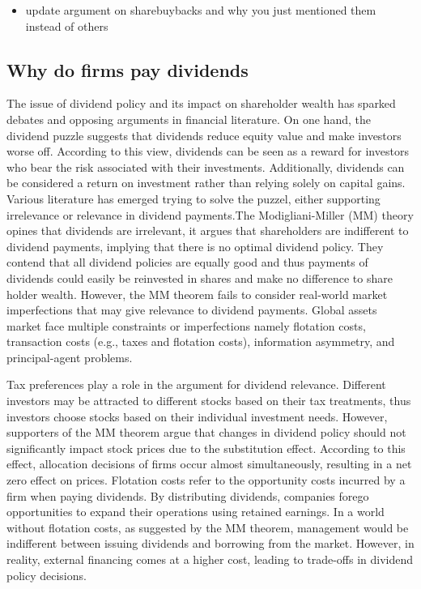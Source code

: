 \documentclass[11pt,preprint, authoryear]{elsarticle}
\numberwithin{equation}{section}
\numberwithin{figure}{section}
\numberwithin{table}{section}
\def\tightlist{} %
\begin{document}
\begin{itemize}
\tightlist
\item
  update argument on sharebuybacks and why you just mentioned them
  instead of others
\end{itemize}

\hypertarget{why-do-firms-pay-dividends}{%
\subsection{Why do firms pay
dividends}\label{why-do-firms-pay-dividends}}

The issue of dividend policy and its impact on shareholder wealth has
sparked debates and opposing arguments in financial literature. On one
hand, the dividend puzzle suggests that dividends reduce equity value
and make investors worse off. According to this view, dividends can be
seen as a reward for investors who bear the risk associated with their
investments. Additionally, dividends can be considered a return on
investment rather than relying solely on capital gains. Various
literature has emerged trying to solve the puzzel, either supporting
irrelevance or relevance in dividend payments.The Modigliani-Miller (MM)
theory opines that dividends are irrelevant, it argues that shareholders
are indifferent to dividend payments, implying that there is no optimal
dividend policy. They contend that all dividend policies are equally
good and thus payments of dividends could easily be reinvested in shares
and make no difference to share holder wealth. However, the MM theorem
fails to consider real-world market imperfections that may give
relevance to dividend payments. Global assets market face multiple
constraints or imperfections namely flotation costs, transaction costs
(e.g., taxes and flotation costs), information asymmetry, and
principal-agent problems.

Tax preferences play a role in the argument for dividend relevance.
Different investors may be attracted to different stocks based on their
tax treatments, thus investors choose stocks based on their individual
investment needs. However, supporters of the MM theorem argue that
changes in dividend policy should not significantly impact stock prices
due to the substitution effect. According to this effect, allocation
decisions of firms occur almost simultaneously, resulting in a net zero
effect on prices. Flotation costs refer to the opportunity costs
incurred by a firm when paying dividends. By distributing dividends,
companies forego opportunities to expand their operations using retained
earnings. In a world without flotation costs, as suggested by the MM
theorem, management would be indifferent between issuing dividends and
borrowing from the market. However, in reality, external financing comes
at a higher cost, leading to trade-offs in dividend policy decisions.
\end{document}
